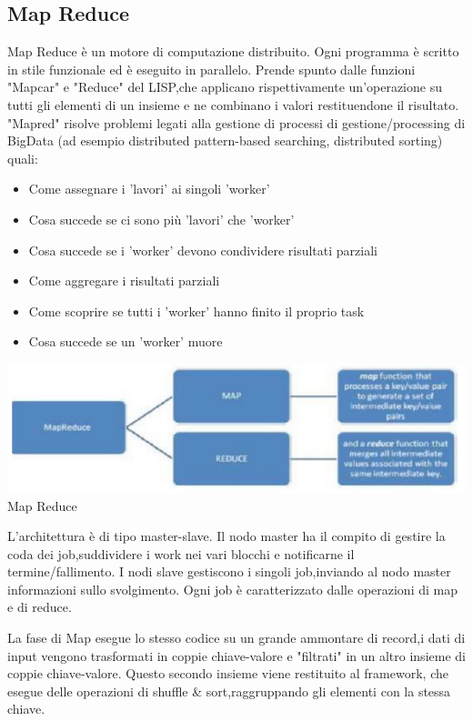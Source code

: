 \documentclass[a4page, 11pt]{article}
\begin{document}
\subsection{Map Reduce}
Map Reduce è un motore di computazione distribuito. Ogni programma è scritto in stile funzionale ed è eseguito in parallelo. Prende spunto dalle funzioni "Mapcar" e "Reduce" del LISP,che applicano rispettivamente un'operazione su tutti gli elementi di un insieme e ne combinano i valori restituendone il risultato. "Mapred" risolve problemi legati alla gestione di processi di gestione/processing di BigData (ad esempio distributed pattern-based searching, distributed sorting) quali:
\begin{itemize}[noitemsep]
\item Come assegnare i 'lavori' ai singoli 'worker'
\item Cosa succede se ci sono più 'lavori' che 'worker'
\item Cosa succede se i 'worker' devono condividere risultati parziali
\item Come aggregare i risultati parziali
\item Come scoprire se tutti i 'worker' hanno finito il proprio task
\item Cosa succede se un 'worker' muore
\end{itemize}
\begin{center}
	\includegraphics[scale=1]{IMAGE8.png}\\
	Map Reduce
\end{center}
L'architettura è di tipo master-slave. Il nodo master ha il compito di gestire la coda dei job,suddividere i work nei vari blocchi e notificarne il termine/fallimento. I nodi slave gestiscono i singoli job,inviando al nodo master informazioni sullo svolgimento.
\newline
Ogni job è caratterizzato dalle operazioni di map e di reduce. 

La fase di Map esegue lo stesso codice su un grande ammontare di record,i dati di input vengono trasformati in coppie chiave-valore e "filtrati" in un altro insieme di coppie chiave-valore. Questo secondo insieme viene restituito al framework, che esegue delle operazioni di shuffle \& sort,raggruppando gli elementi con la stessa chiave. 
\end{document}
